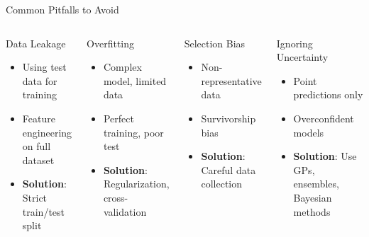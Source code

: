 \documentclass[aspectratio=169,11pt]{beamer}
\begin{document}
\begin{frame}{Common Pitfalls to Avoid}
\begin{columns}
\begin{alertblock}{Data Leakage}
\begin{itemize}
    \item Using test data for training
    \item Feature engineering on full dataset
    \item \textbf{Solution}: Strict train/test split
\end{itemize}
\end{alertblock}

\begin{alertblock}{Overfitting}
\begin{itemize}
    \item Complex model, limited data
    \item Perfect training, poor test
    \item \textbf{Solution}: Regularization, cross-validation
\end{itemize}
\end{alertblock}

\begin{alertblock}{Selection Bias}
\begin{itemize}
    \item Non-representative data
    \item Survivorship bias
    \item \textbf{Solution}: Careful data collection
\end{itemize}
\end{alertblock}

\begin{alertblock}{Ignoring Uncertainty}
\begin{itemize}
    \item Point predictions only
    \item Overconfident models
    \item \textbf{Solution}: Use GPs, ensembles, Bayesian methods
\end{itemize}
\end{alertblock}
\end{columns}
\end{frame}

\end{document}
